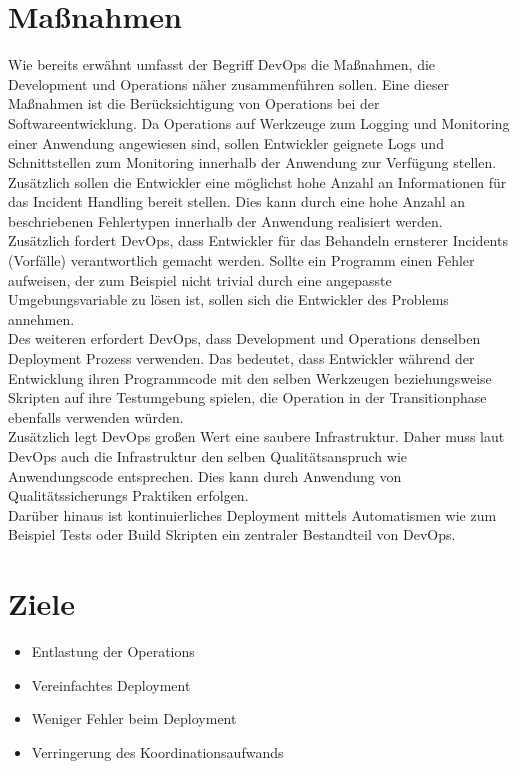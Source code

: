 \section{Maßnahmen}
Wie bereits erwähnt umfasst der Begriff DevOps die Maßnahmen, die Development und Operations näher zusammenführen sollen. Eine dieser Maßnahmen ist die Berücksichtigung von Operations bei der Softwareentwicklung. Da Operations auf Werkzeuge zum Logging und Monitoring einer Anwendung angewiesen sind, sollen Entwickler geignete Logs und Schnittstellen zum Monitoring innerhalb der Anwendung zur Verfügung stellen. Zusätzlich sollen die Entwickler eine möglichst hohe Anzahl an Informationen für das Incident Handling bereit stellen. Dies kann durch eine hohe Anzahl an beschriebenen Fehlertypen innerhalb der Anwendung realisiert werden. \\
Zusätzlich fordert DevOps, dass Entwickler für das Behandeln ernsterer Incidents (Vorfälle) verantwortlich gemacht werden. Sollte ein Programm einen Fehler aufweisen, der zum Beispiel nicht trivial durch eine angepasste Umgebungsvariable zu lösen ist, sollen sich die Entwickler des Problems annehmen. \\
Des weiteren erfordert DevOps, dass Development und Operations denselben Deployment Prozess verwenden. Das bedeutet, dass Entwickler während der Entwicklung ihren Programmcode mit den selben Werkzeugen beziehungsweise Skripten auf ihre Testumgebung spielen, die Operation  in der Transitionphase ebenfalls verwenden würden.\\
Zusätzlich legt DevOps großen Wert eine saubere Infrastruktur. Daher muss laut DevOps auch die Infrastruktur den selben Qualitätsanspruch wie Anwendungscode entsprechen. Dies kann durch Anwendung von Qualitätssicherungs Praktiken erfolgen. \\
Darüber hinaus ist kontinuierliches Deployment mittels Automatismen wie zum Beispiel Tests oder Build Skripten ein zentraler Bestandteil von DevOps.

\section{Ziele}
\begin{itemize}
\item Entlastung der Operations
\item Vereinfachtes Deployment
\item Weniger Fehler beim Deployment
\item Verringerung des Koordinationsaufwands
\end{itemize}